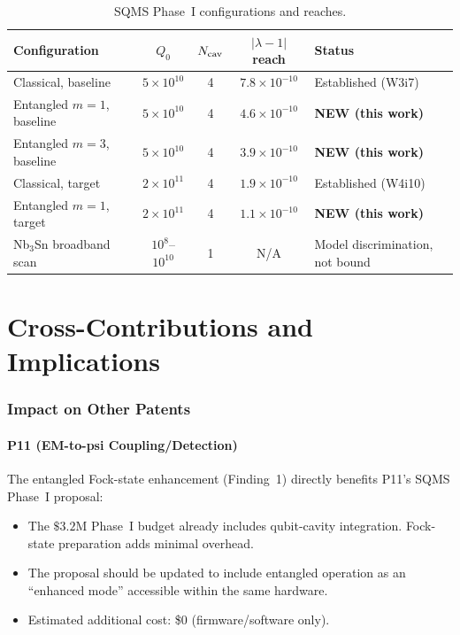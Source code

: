\documentclass[11pt]{article}
\newcommand{\lam}{\lambda}
\newcommand{\ee}[1]{\times 10^{#1}}
\newcommand{\lbone}{|\lam - 1|}
\theoremstyle{definition}
\theoremstyle{remark}
\begin{document}
\begin{table}[H]
\centering
\caption{SQMS Phase~I configurations and reaches.}
\label{tab:phase_I}
\renewcommand{\arraystretch}{1.4}
\begin{tabular}{@{}lcccl@{}}
\toprule
\textbf{Configuration} & $Q_0$ & $N_{\rm cav}$ & $\lbone$ reach
& \textbf{Status} \\
\midrule
\rowcolor{rowhi}
Classical, baseline & $5\ee{10}$ & 4 & $7.8\ee{-10}$
& Established (W3i7) \\
\rowcolor{rowhi}
Entangled $m=1$, baseline & $5\ee{10}$ & 4 & $4.6\ee{-10}$
& \textbf{NEW (this work)} \\
\rowcolor{rowhi}
Entangled $m=3$, baseline & $5\ee{10}$ & 4 & $3.9\ee{-10}$
& \textbf{NEW (this work)} \\
\rowcolor{rowmed}
Classical, target & $2\ee{11}$ & 4 & $1.9\ee{-10}$
& Established (W4i10) \\
\rowcolor{rowmed}
Entangled $m=1$, target & $2\ee{11}$ & 4 & $1.1\ee{-10}$
& \textbf{NEW (this work)} \\
\rowcolor{rowlo}
Nb$_3$Sn broadband scan & $10^8$--$10^{10}$ & 1 & N/A
& Model discrimination, not bound \\
\bottomrule
\end{tabular}
\end{table}


\part{Cross-Contributions and Implications}
\label{part:cross}

\section{Impact on Other Patents}

\subsection{P11 (EM-to-psi Coupling/Detection)}

The entangled Fock-state enhancement (Finding~1) directly benefits
P11's SQMS Phase~I proposal:
\begin{itemize}[nosep]
\item The $\$3.2$M Phase~I budget already includes qubit-cavity
  integration. Fock-state preparation adds minimal overhead.
\item The proposal should be updated to include entangled operation
  as an ``enhanced mode'' accessible within the same hardware.
\item Estimated additional cost: \$0 (firmware/software only).
\end{itemize}
\end{document}
